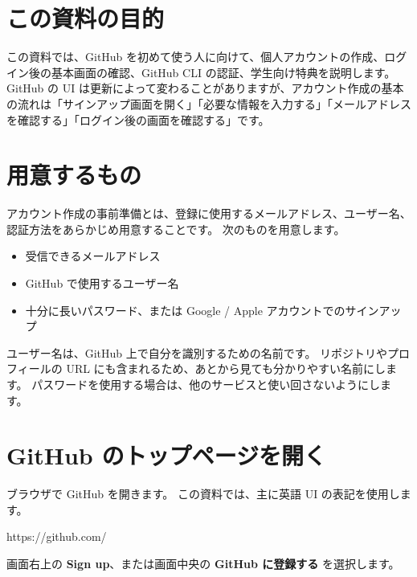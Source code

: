 \documentclass[a4paper]{jlreq}
\title{\materialtitle}
\author{kska6}
\date{\today}
\newcommand{\term}[1]{\textbf{#1}}
\begin{document}
\maketitle
\tableofcontents
\newpage

\section*{この資料の目的}

この資料では、GitHub を初めて使う人に向けて、個人アカウントの作成、ログイン後の基本画面の確認、GitHub CLI の認証、学生向け特典を説明します。
GitHub の UI は更新によって変わることがありますが、アカウント作成の基本の流れは「サインアップ画面を開く」「必要な情報を入力する」「メールアドレスを確認する」「ログイン後の画面を確認する」です\cite{github-account}。

\section{用意するもの}

アカウント作成の事前準備とは、登録に使用するメールアドレス、ユーザー名、認証方法をあらかじめ用意することです。
次のものを用意します。

\begin{itemize}
  \item 受信できるメールアドレス
  \item GitHub で使用するユーザー名
  \item 十分に長いパスワード、または Google / Apple アカウントでのサインアップ
\end{itemize}

ユーザー名は、GitHub 上で自分を識別するための名前です。
リポジトリやプロフィールの URL にも含まれるため、あとから見ても分かりやすい名前にします。
パスワードを使用する場合は、他のサービスと使い回さないようにします。

\section{GitHub のトップページを開く}

ブラウザで GitHub を開きます。
この資料では、主に英語 UI の表記を使用します。

\begin{codeblock}
https://github.com/
\end{codeblock}

画面右上の \term{Sign up}、または画面中央の \term{GitHub に登録する} を選択します\cite{github-account}。
\end{document}
